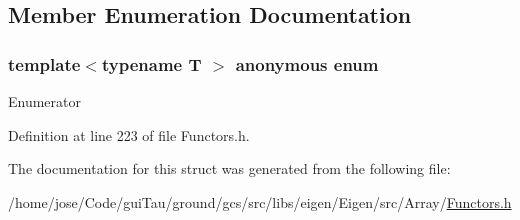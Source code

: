 \subsection{Member Enumeration Documentation}
\hypertarget{structei__functor__traits_3_01std_1_1minus_3_01_t_01_4_01_4_a17701a375ac9c699d8b70c103372b4da}{\subsubsection[{anonymous enum}]{\setlength{\rightskip}{0pt plus 5cm}template$<$typename T $>$ anonymous enum}}\label{structei__functor__traits_3_01std_1_1minus_3_01_t_01_4_01_4_a17701a375ac9c699d8b70c103372b4da}
\begin{Desc}
\item[Enumerator]\par
\begin{description}
\item[{\em 
\hypertarget{structei__functor__traits_3_01std_1_1minus_3_01_t_01_4_01_4_a17701a375ac9c699d8b70c103372b4daa7a97d89f0eede28eefe9e386a33b7140}{Cost}\label{structei__functor__traits_3_01std_1_1minus_3_01_t_01_4_01_4_a17701a375ac9c699d8b70c103372b4daa7a97d89f0eede28eefe9e386a33b7140}
}]\item[{\em 
\hypertarget{structei__functor__traits_3_01std_1_1minus_3_01_t_01_4_01_4_a17701a375ac9c699d8b70c103372b4daa097d77aa116dbe0058755e04228f9dab}{Packet\-Access}\label{structei__functor__traits_3_01std_1_1minus_3_01_t_01_4_01_4_a17701a375ac9c699d8b70c103372b4daa097d77aa116dbe0058755e04228f9dab}
}]\end{description}
\end{Desc}


Definition at line 223 of file Functors.\-h.



The documentation for this struct was generated from the following file\-:\begin{DoxyCompactItemize}
\item 
/home/jose/\-Code/gui\-Tau/ground/gcs/src/libs/eigen/\-Eigen/src/\-Array/\hyperlink{_array_2_functors_8h}{Functors.\-h}\end{DoxyCompactItemize}
